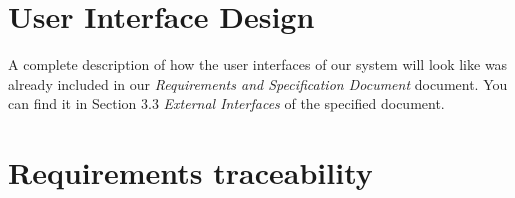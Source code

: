 \documentclass[a4paper]{article}
\begin{document}
\section{User Interface Design}
A complete description of how the user interfaces of our system will look like was already included in our \emph{Requirements and Specification Document} document. You can find it in Section 3.3 \emph{External Interfaces} of the specified document.

\section{Requirements traceability}

\renewcommand{\arraystretch}{1.15}
\def \customTableWidth{12cm}
\end{document}
